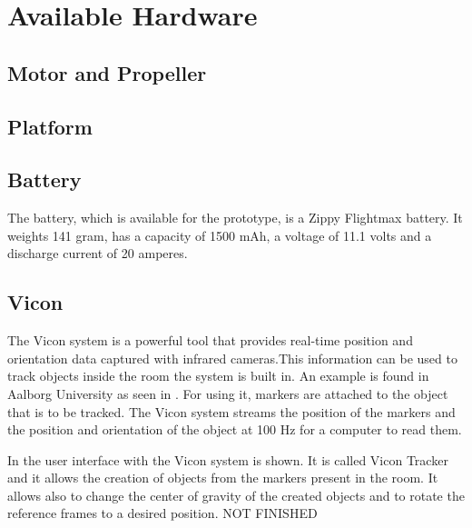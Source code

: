 \section{Available Hardware}

\subsection{Motor and Propeller}

\subsection{Platform}

\subsection{Battery}

The battery, which is available for the prototype, is a Zippy Flightmax battery. It weights 141 gram, has a capacity of 1500 mAh, a voltage of 11.1 volts and a discharge current of 20 amperes. 

\subsection{Vicon}

The Vicon system is a powerful tool that provides real-time position and orientation data captured with infrared cameras.This information can be used to track objects inside the room the system is built in. An example is found in Aalborg University as seen in . 
For using it, markers are attached to the object that is to be tracked. The Vicon system streams the position of the markers and the position and orientation of the object at 100 Hz for a computer to read them.

In  the user interface with the Vicon system is shown. It is called Vicon Tracker and it allows the creation of objects from the markers present in the room. It allows also to change the center of gravity of the created objects and to rotate the reference frames to a desired position.
NOT FINISHED
